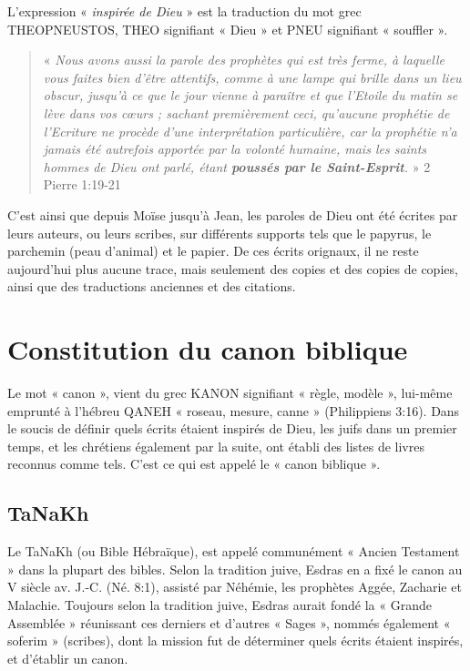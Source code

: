\begin{small}
L'expression « \emph{inspirée de Dieu} » est la traduction du mot grec THEOPNEUSTOS, THEO signifiant « Dieu » et PNEU signifiant « souffler ».

\begin{quote}
« \emph{Nous avons aussi la parole des prophètes qui est très ferme, à laquelle vous faites bien d'être attentifs, comme à une lampe qui brille dans un lieu obscur, jusqu'à ce que le jour vienne à paraître et que l'Etoile du matin se lève dans vos cœurs ; sachant premièrement ceci, qu'aucune prophétie de l'Ecriture ne procède d'une interprétation particulière, car la prophétie n'a jamais été autrefois apportée par la volonté humaine, mais les saints hommes de Dieu ont parlé, étant \textbf{poussés par le Saint-Esprit}.} » 2 Pierre 1:19-21
\end{quote}

C'est ainsi que depuis Moïse jusqu'à Jean, les paroles de Dieu ont été écrites par leurs auteurs, ou leurs scribes, sur différents supports tels que le papyrus, le parchemin (peau d'animal) et le papier. De ces écrits orignaux, il ne reste aujourd'hui plus aucune trace, mais seulement des copies et des copies de copies, ainsi que des traductions anciennes et des citations.

\section*{Constitution du canon biblique}

Le mot « canon », vient du grec KANON signifiant « règle, modèle », lui-même emprunté à l'hébreu QANEH « roseau, mesure, canne » (Philippiens 3:16). Dans le soucis de définir quels écrits étaient inspirés de Dieu, les juifs dans un premier temps, et les chrétiens également par la suite, ont établi des listes de livres reconnus comme tels. C'est ce qui est appelé le « canon biblique ».

\subsection*{TaNaKh}

Le TaNaKh (ou Bible Hébraïque), est appelé communément « Ancien Testament » dans la plupart des bibles. Selon la tradition juive, Esdras en a fixé le canon au V siècle av. J.-C. (Né. 8:1), assisté par Néhémie, les prophètes Aggée, Zacharie et Malachie. Toujours selon la tradition juive, Esdras aurait fondé la « Grande Assemblée » réunissant ces derniers et d'autres « Sages », nommés également « soferim » (scribes), dont la mission fut de déterminer quels écrits étaient inspirés, et d'établir un canon.\bigskip


\end{small}
